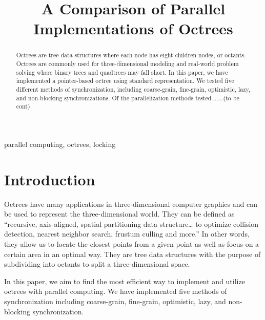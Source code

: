 \documentclass[conference]{IEEEtran}
\begin{document}
\title{A Comparison of Parallel Implementations of Octrees
}

\author{

}


\maketitle

\begin{abstract}
Octrees are tree data structures where each node has eight children nodes, or octants. Octrees are commonly used for three-dimensional modeling and real-world problem solving where binary trees and quadtrees may fall short. In this paper, we have implemented a pointer-based octree using standard representation. We tested five different methods of synchronization, including coarse-grain, fine-grain, optimistic, lazy, and non-blocking synchronizations. Of the parallelization methods tested.......(to be cont)

\end{abstract}

\begin{IEEEkeywords}
parallel computing, octrees, locking
\end{IEEEkeywords}

\section{Introduction}

Octrees have many applications in three-dimensional computer graphics and can be used to represent the three-dimensional world. They can be defined as “recursive, axis-aligned, spatial partitioning data structure… to optimize collision detection, nearest neighbor search, frustum culling and more.” \cite{octrees1} In other words, they allow us to locate the closest points from a given point as well as focus on a certain area in an optimal way. They are tree data structures with the purpose of subdividing into octants to split a three-dimensional space.

In this paper, we aim to find the most efficient way to implement and utilize octrees with parallel computing. We have implemented five methods of synchronization including coarse-grain, fine-grain, optimistic, lazy, and non-blocking synchronization. 
\end{document}
